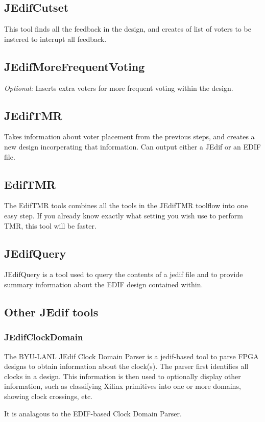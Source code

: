 \documentclass[english]{article}
\begin{document}
\subsection{JEdifCutset}
This tool finds all the feedback in the design, and creates of list of voters
to be instered to interupt all feedback.

\subsection{JEdifMoreFrequentVoting}
\emph{Optional:} Inserts extra voters for more frequent voting within
the design.

\subsection{JEdifTMR}
Takes information about voter placement from the previous steps, and
creates a new design incorperating that information. Can output either
a JEdif or an EDIF file.

\subsection{EdifTMR}
The EdifTMR tools combines all the tools in the JEdifTMR toolflow into
one easy step. If you already know exactly what setting you wish use
to perform TMR, this tool will be faster.

\subsection{JEdifQuery}
JEdifQuery is a tool used to query the contents of a jedif file and to 
provide summary information about the EDIF design contained within.

\subsection{Other JEdif tools}
\subsubsection{JEdifClockDomain} 
The BYU-LANL JEdif Clock Domain Parser is a jedif-based tool to parse FPGA
designs to obtain information about the clock(s). The parser first identifies
all clocks in a design. This information is then used to optionally display
other information, such as classifying Xilinx primitives into one or more 
domains, showing clock crossings, etc.

It is analagous to the EDIF-based Clock Domain Parser.
\end{document}
